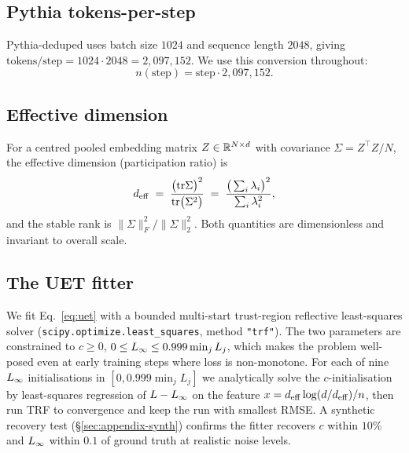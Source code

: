\subsection{Pythia tokens-per-step}
Pythia-deduped uses batch size $1024$ and sequence length $2048$, giving
$\text{tokens/step} = 1024 \cdot 2048 = 2{,}097{,}152$. We use this
conversion throughout:
\[
n(\text{step}) = \text{step} \cdot 2{,}097{,}152.
\]

\subsection{Effective dimension}
For a centred pooled embedding matrix $Z \in \mathbb{R}^{N\times d}$ with covariance
$\Sigma = Z^\top Z / N$, the effective dimension (participation ratio) is
\begin{equation}
d_{\mathrm{eff}} \;=\; \frac{\big(\mathrm{tr} \Sigma\big)^{2}}{\mathrm{tr}\big(\Sigma^{2}\big)}
         \;=\; \frac{\big(\sum_i \lambda_i\big)^2}{\sum_i \lambda_i^2},
\end{equation}
and the stable rank is $\|\Sigma\|_F^2 / \|\Sigma\|_2^2$. Both
quantities are dimensionless and invariant to overall scale.

\subsection{The UET fitter}
\label{sec:fitter}
We fit Eq.~\eqref{eq:uet} with a bounded multi-start trust-region
reflective least-squares solver (\texttt{scipy.optimize.least\_squares},
method \texttt{"trf"}). The two parameters are constrained to
$c \geq 0$, $0 \leq L_{\infty} \leq 0.999 \min_j L_j$, which makes the problem
well-posed even at early training steps where loss is non-monotone.
For each of nine $L_{\infty}$ initialisations in
$[0, 0.999\min_j L_j]$ we analytically solve the
$c$-initialisation by least-squares regression of $L - L_{\infty}$ on the
feature $x = d_{\mathrm{eff}}\log(d/d_{\mathrm{eff}})/n$, then run TRF to convergence and keep
the run with smallest RMSE. A synthetic recovery test
(\S\ref{sec:appendix-synth}) confirms the fitter recovers $c$ within
$10\%$ and $L_{\infty}$ within $0.1$ of ground truth at realistic noise levels.

